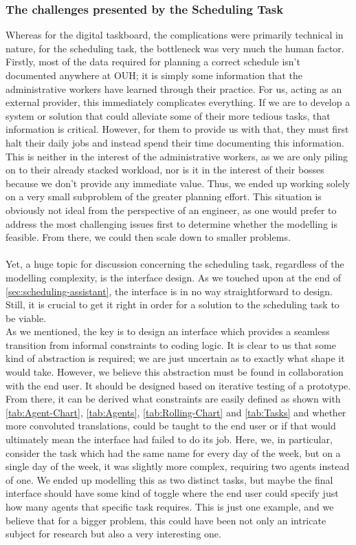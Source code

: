 \subsubsection*{The challenges presented by the Scheduling Task}
Whereas for the digital taskboard, the complications were primarily technical in nature, for the scheduling task, the bottleneck was very much the human factor.
\\
Firstly, most of the data required for planning a correct schedule isn't documented anywhere at OUH; it is simply some information that the administrative workers have learned through their practice. For us, acting as an external provider, this immediately complicates everything. If we are to develop a system or solution that could alleviate some of their more tedious tasks, that information is critical. However, for them to provide us with that, they must first halt their daily jobs and instead spend their time documenting this information. This is neither in the interest of the administrative workers, as we are only piling on to their already stacked workload, nor is it in the interest of their bosses because we don't provide any immediate value. Thus, we ended up working solely on a very small subproblem of the greater planning effort. This situation is obviously not ideal from the perspective of an engineer, as one would prefer to address the most challenging issues first to determine whether the modelling is feasible. From there, we could then scale down to smaller problems.
\\
\\
Yet, a huge topic for discussion concerning the scheduling task, regardless of the modelling complexity, is the interface design. As we touched upon at the end of \autoref{sec:scheduling-assistant}, the interface is in no way straightforward to design. Still, it is crucial to get it right in order for a solution to the scheduling task to be viable. 
\\
As we mentioned, the key is to design an interface which provides a seamless transition from informal constraints to coding logic. It is clear to us that some kind of abstraction is required; we are just uncertain as to exactly what shape it would take. However, we believe this abstraction must be found in collaboration with the end user. It should be designed based on iterative testing of a prototype. From there, it can be derived what constraints are easily defined as shown with \autoref{tab:Agent-Chart}, \autoref{tab:Agents}, \autoref{tab:Rolling-Chart} and \autoref{tab:Tasks} and whether more convoluted translations, could be taught to the end user or if that would ultimately mean the interface had failed to do its job. Here, we, in particular, consider the task which had the same name for every day of the week, but on a single day of the week, it was slightly more complex, requiring two agents instead of one. We ended up modelling this as two distinct tasks, but maybe the final interface should have some kind of toggle where the end user could specify just how many agents that specific task requires. This is just one example, and we believe that for a bigger problem, this could have been not only an intricate subject for research but also a very interesting one.

